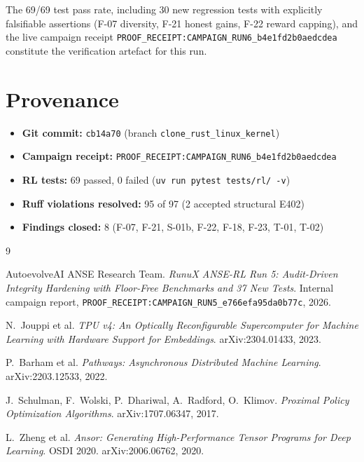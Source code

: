 \documentclass[10pt,twocolumn]{article}
\begin{document}
The 69/69 test pass rate, including 30 new regression tests with explicitly
falsifiable assertions (F-07 diversity, F-21 honest gains, F-22 reward capping),
and the live campaign receipt
\texttt{PROOF\_RECEIPT:CAMPAIGN\_RUN6\_b4e1fd2b0aedcdea} constitute the
verification artefact for this run.

\section*{Provenance}

\begin{itemize}[leftmargin=*]
\item \textbf{Git commit:} \texttt{cb14a70} (branch \texttt{clone\_rust\_linux\_kernel})
\item \textbf{Campaign receipt:} \texttt{PROOF\_RECEIPT:CAMPAIGN\_RUN6\_b4e1fd2b0aedcdea}
\item \textbf{RL tests:} 69 passed, 0 failed (\texttt{uv run pytest tests/rl/ -v})
\item \textbf{Ruff violations resolved:} 95 of 97 (2 accepted structural E402)
\item \textbf{Findings closed:} 8 (F-07, F-21, S-01b, F-22, F-18, F-23, T-01, T-02)
\end{itemize}


\begin{thebibliography}{9}

AutoevolveAI ANSE Research Team.
\textit{RunuX ANSE-RL Run 5: Audit-Driven Integrity Hardening with
Floor-Free Benchmarks and 37 New Tests}.
Internal campaign report, \texttt{PROOF\_RECEIPT:CAMPAIGN\_RUN5\_e766efa95da0b77c}, 2026.

N.~Jouppi et al.
\textit{TPU v4: An Optically Reconfigurable Supercomputer for Machine Learning
with Hardware Support for Embeddings}.
arXiv:2304.01433, 2023.

P.~Barham et al.
\textit{Pathways: Asynchronous Distributed Machine Learning}.
arXiv:2203.12533, 2022.

J.~Schulman, F.~Wolski, P.~Dhariwal, A.~Radford, O.~Klimov.
\textit{Proximal Policy Optimization Algorithms}.
arXiv:1707.06347, 2017.

L.~Zheng et al.
\textit{Ansor: Generating High-Performance Tensor Programs for Deep Learning}.
OSDI 2020. arXiv:2006.06762, 2020.

\end{thebibliography}
\end{document}
